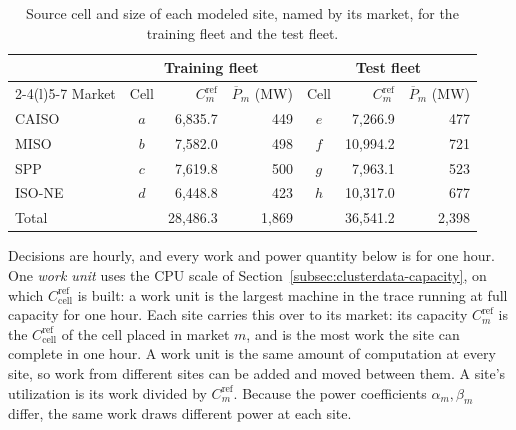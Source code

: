 \documentclass{UNCC-thesis}
\begin{document}
\begin{table}[htbp]
  \centering
  \footnotesize
  \caption{Source cell and size of each modeled site, named by its market,
  for the training fleet and the test fleet.}
  \label{tab:active-market-map}
  \begin{tabular}{@{}lcrrcrr@{}}
    \toprule
    & \multicolumn{3}{c}{Training fleet} & \multicolumn{3}{c}{Test fleet} \\
    \cmidrule(lr){2-4}\cmidrule(l){5-7}
    Market & Cell & \(C^{\mathrm{ref}}_m\) & \(\overline P_m\) (MW)
                & Cell & \(C^{\mathrm{ref}}_m\) & \(\overline P_m\) (MW) \\
    \midrule
    CAISO          & \(a\) & 6,835.7 & 449 & \(e\) & 7,266.9 & 477 \\
    MISO           & \(b\) & 7,582.0 & 498 & \(f\) & 10,994.2 & 721 \\
    SPP            & \(c\) & 7,619.8 & 500 & \(g\) & 7,963.1 & 523 \\
    ISO-NE         & \(d\) & 6,448.8 & 423 & \(h\) & 10,317.0 & 677 \\
    \addlinespace
    Total          &       & 28,486.3 & 1,869 &     & 36,541.2 & 2,398 \\
    \bottomrule
  \end{tabular}
\end{table}

Decisions are hourly, and every work and power quantity below is for one
hour.
One \emph{work unit} uses the CPU scale of
Section~\ref{subsec:clusterdata-capacity}, on which
\(C^{\mathrm{ref}}_{\mathrm{cell}}\) is built: a work unit is the largest machine in
the trace running at full capacity for one hour. Each site carries this over
to its market: its capacity \(C^{\mathrm{ref}}_m\) is the
\(C^{\mathrm{ref}}_{\mathrm{cell}}\) of the cell placed in market \(m\), and
is the most work the site can complete in one hour. A work unit
is the same amount of computation at every site, so work from different
sites can be added and moved between them. A site's utilization is its work
divided by \(C^{\mathrm{ref}}_m\). Because the power coefficients
\(\alpha_m,\beta_m\) differ, the same work draws different power at each
site.
\end{document}

